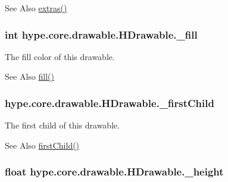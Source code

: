 \begin{DoxySeeAlso}{See Also}
\hyperlink{classhype_1_1core_1_1drawable_1_1_h_drawable_a3111c7ead30122880433c3244be5680a}{extras()} 
\end{DoxySeeAlso}
\hypertarget{classhype_1_1core_1_1drawable_1_1_h_drawable_a5f07bd6382bd895ca51c51a2285a31dc}{
\subsubsection[{\-\_\-fill}]{\setlength{\rightskip}{0pt plus 5cm}int hype.\-core.\-drawable.\-H\-Drawable.\-\_\-fill\hspace{0.3cm}{\ttfamily [protected]}}}\label{classhype_1_1core_1_1drawable_1_1_h_drawable_a5f07bd6382bd895ca51c51a2285a31dc}


The fill color of this drawable. 

\begin{DoxySeeAlso}{See Also}
\hyperlink{classhype_1_1core_1_1drawable_1_1_h_drawable_a3ea1f5a07f50a01c5210a059056758a7}{fill()} 
\end{DoxySeeAlso}
\hypertarget{classhype_1_1core_1_1drawable_1_1_h_drawable_ae09b30df6ce561c6e7d5dd4ca43ebd41}{
\subsubsection[{\-\_\-first\-Child}]{ hype.\-core.\-drawable.\-H\-Drawable.\-\_\-first\-Child\hspace{0.3cm}{\ttfamily [protected]}}}\label{classhype_1_1core_1_1drawable_1_1_h_drawable_ae09b30df6ce561c6e7d5dd4ca43ebd41}


The first child of this drawable. 

\begin{DoxySeeAlso}{See Also}
\hyperlink{classhype_1_1core_1_1drawable_1_1_h_drawable_a30494a50fd2a78b74994c93bef961d8c}{first\-Child()} 
\end{DoxySeeAlso}
\hypertarget{classhype_1_1core_1_1drawable_1_1_h_drawable_ac4171079b3f6831d4f982ad2ae6363ce}{
\subsubsection[{\-\_\-height}]{\setlength{\rightskip}{0pt plus 5cm}float hype.\-core.\-drawable.\-H\-Drawable.\-\_\-height\hspace{0.3cm}{\ttfamily [protected]}}}\label{classhype_1_1core_1_1drawable_1_1_h_drawable_ac4171079b3f6831d4f982ad2ae6363ce}


